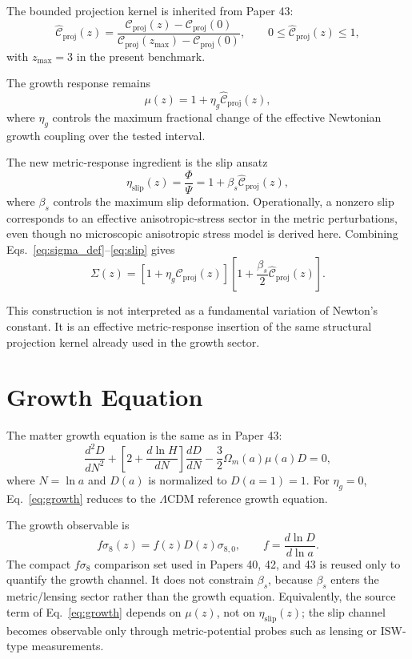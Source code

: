 \documentclass[11pt,a4paper]{article}
\newcommand{\LCDM}{\Lambda\mathrm{CDM}}
\newcommand{\Chatproj}{\widehat{\mathcal{C}}_{\mathrm{proj}}}
\newcommand{\fsig}{f\sigma_8}
\newcommand{\etaslip}{\eta_{\mathrm{slip}}}
\begin{document}
The bounded projection kernel is inherited from Paper 43:
\begin{equation}
\Chatproj(z)
=
\frac{
\mathcal{C}_{\mathrm{proj}}(z)-\mathcal{C}_{\mathrm{proj}}(0)
}{
\mathcal{C}_{\mathrm{proj}}(z_{\max})-\mathcal{C}_{\mathrm{proj}}(0)
},
\qquad
0\le\Chatproj(z)\le1,
\label{eq:chat}
\end{equation}
with $z_{\max}=3$ in the present benchmark.

The growth response remains
\begin{equation}
\mu(z)
=
1+\eta_g\Chatproj(z),
\label{eq:mu}
\end{equation}
where $\eta_g$ controls the maximum fractional change of the effective
Newtonian growth coupling over the tested interval.

The new metric-response ingredient is the slip ansatz
\begin{equation}
\etaslip(z)
=
\frac{\Phi}{\Psi}
=
1+\beta_s\Chatproj(z),
\label{eq:slip}
\end{equation}
where $\beta_s$ controls the maximum slip deformation.
Operationally, a nonzero slip corresponds to an effective anisotropic-stress
sector in the metric perturbations, even though no microscopic anisotropic
stress model is derived here.
Combining Eqs.~\eqref{eq:sigma_def}--\eqref{eq:slip} gives
\begin{equation}
\Sigma(z)
=
\left[1+\eta_g\Chatproj(z)\right]
\left[
1+\frac{\beta_s}{2}\Chatproj(z)
\right].
\label{eq:sigma_maat}
\end{equation}

This construction is not interpreted as a fundamental variation of Newton's
constant.
It is an effective metric-response insertion of the same structural projection
kernel already used in the growth sector.

\section{Growth Equation}

The matter growth equation is the same as in Paper 43:
\begin{equation}
\frac{d^2D}{dN^2}
+
\left[
2+\frac{d\ln H}{dN}
\right]
\frac{dD}{dN}
-
\frac32\Omega_m(a)\mu(a)D
=0,
\label{eq:growth}
\end{equation}
where $N=\ln a$ and $D(a)$ is normalized to $D(a=1)=1$.
For $\eta_g=0$, Eq.~\eqref{eq:growth} reduces to the $\LCDM$ reference growth
equation.

The growth observable is
\begin{equation}
\fsig(z)
=
f(z)D(z)\sigma_{8,0},
\qquad
f=\frac{d\ln D}{d\ln a}.
\end{equation}
The compact $\fsig$ comparison set used in Papers 40, 42, and 43 is reused
only to quantify the growth channel.
It does not constrain $\beta_s$, because $\beta_s$ enters the metric/lensing
sector rather than the growth equation.
Equivalently, the source term of Eq.~\eqref{eq:growth} depends on $\mu(z)$,
not on $\etaslip(z)$; the slip channel becomes observable only through
metric-potential probes such as lensing or ISW-type measurements.
\end{document}
